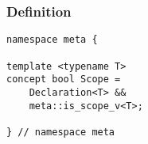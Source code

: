 
\subsubsection{Definition}

\begin{verbatim}
namespace meta {

template <typename T>
concept bool Scope =
	Declaration<T> &&
	meta::is_scope_v<T>;

} // namespace meta
\end{verbatim}
